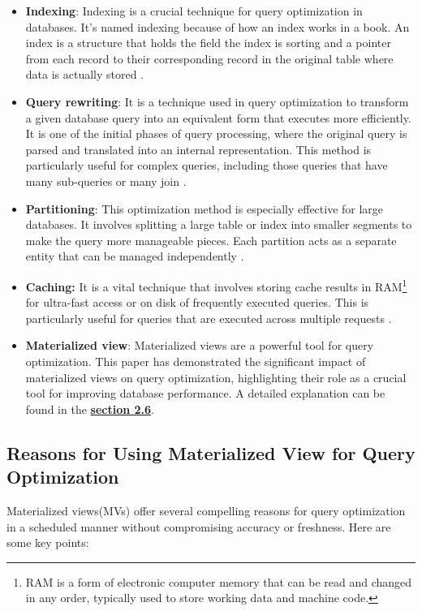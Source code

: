  \begin{itemize}
     \item \textbf{Indexing}: Indexing is a crucial technique for query optimization in databases. It's named indexing because of how an index works in a book. An index is a structure that holds the field the index is sorting and a pointer from each record to their corresponding record in the original table where data is actually stored \cite{tomar-2021,atlassian-no-date}.
     \item \textbf{Query rewriting}: It is a technique used in query optimization to transform a given database query into an equivalent form that executes more efficiently. It is one of the initial phases of query processing, where the original query is parsed and translated into an internal representation. This method is particularly useful for complex queries, including those queries that have many sub-queries or many join \cite{pitoura-2009,unknown-IBM-25-2024}.
     
     \item \textbf{Partitioning}: This optimization method is especially effective for large databases. It involves splitting a large table or index into smaller segments to make the query more manageable pieces. Each partition acts as a separate entity that can be managed independently \cite{planck-2024}.
     
     \item \textbf{Caching:} It is a vital technique that involves storing cache results in RAM\footnote{ RAM is a form of electronic computer memory that can be read and changed in any order, typically used to store working data and machine code.} for ultra-fast access or on disk of frequently executed queries. This is particularly useful for queries that are executed across multiple requests \cite{Bit-Fetch-2024}.
     
     \item\textbf{Materialized view}: Materialized views are a powerful tool for query optimization. This paper has demonstrated the significant impact of materialized views on query optimization, highlighting their role as a crucial tool for improving database performance. A detailed explanation can be found in the \hyperref[term:materialized_views]{\textbf{section 2.6}}.\vspace{.4cm}
     
 \end{itemize}
 
 \subsection{Reasons for Using Materialized View for Query Optimization}
 Materialized views(MVs) offer several compelling reasons for query optimization in a scheduled manner without compromising accuracy or freshness. Here are some key points:
 
